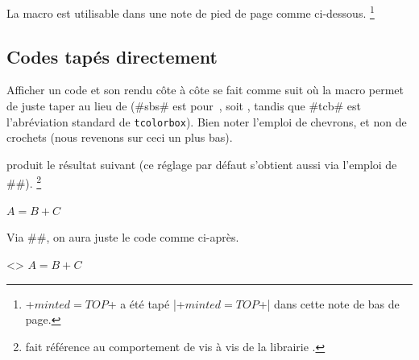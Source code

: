 \documentclass{tutodoc}
\begin{document}
\begin{tdocnote}
    La macro  est utilisable dans une note de pied de page comme ci-dessous.%
    \footnote{
        \tdoclatexin+$minted = TOP$+ a été tapé \tdoclatexin|\tdoclatexin+$minted = TOP$+| dans cette note de bas de page.
    }
\end{tdocnote}



\subsection{Codes tapés directement}
\label{tutodoc-listing-latex-direct}

\begin{tdocexa}
    Afficher un code et son rendu côte à côte se fait comme suit où la macro  permet de juste taper  au lieu de  (\tdoclatexin#sbs# est pour \,, soit , tandis que \tdoclatexin#tcb# est l'abréviation standard de \texttt{tcolorbox}). Bien noter l'emploi de chevrons, et non de crochets (nous revenons sur ceci un plus bas).

\end{tdocexa}


\begin{tdocexa}[À la suite]
     produit le résultat suivant (ce réglage par défaut s'obtient aussi via l'emploi de \tdoclatexin##).%
    \footnote{
         fait référence au comportement  de  vis à vis de la librairie .
    }

    \begin{tdoclatex}
$A = B + C$
    \end{tdoclatex}
\end{tdocexa}


\begin{tdocexa}
    Via \tdoclatexin##, on aura juste le code comme ci-après.

    \begin{tdoclatex}<>
$A = B + C$
    \end{tdoclatex}
\end{tdocexa}
\end{document}
